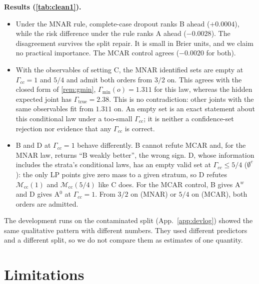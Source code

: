 \documentclass{article}
\theoremstyle{plain}
\theoremstyle{definition}
\theoremstyle{remark}
\newcommand{\Mcc}{\mathcal{M}_{\mathrm{cc}}}
\begin{document}
\textbf{Results (\cref{tab:clean1}).}
\begin{itemize}
\item Under the MNAR rule, complete-case dropout ranks B ahead ($+0.0004$),
while the risk difference under the rule ranks A ahead ($-0.0028$). The
disagreement survives the split repair. It is small in Brier units, and we
claim no practical importance. The MCAR control agrees ($-0.0020$ for both).
\item With the observables of setting C, the MNAR identified sets are empty
at $\Gamma_{cc}=1$ and $5/4$ and admit both orders from $3/2$ on. This agrees
with the closed form of \cref{rem:gmin}, $\Gamma_{\min}(o)=1.311$ for this
law, whereas the hidden expected joint has $\Gamma_{\mathrm{true}}=2.38$. This
is no contradiction: other joints with the same observables fit from $1.311$
on. An empty set is an exact statement about this conditional law under
a too-small $\Gamma_{cc}$; it is neither a confidence-set rejection nor
evidence that any $\Gamma_{cc}$ is correct.
\item B and D at $\Gamma_{cc}=1$ behave differently. B cannot refute MCAR and,
for the MNAR law, returns ``B weakly better'', the wrong sign. D, whose
information includes the strata's conditional laws, has an empty valid set
at $\Gamma_{cc}\le5/4$ ($\emptyset^{c}$): the only LP points give zero mass to a
given stratum, so D refutes $\Mcc(1)$ and $\Mcc(5/4)$ like C does. For the
MCAR control, B gives A$^{w}$ and D gives A$^{0}$ at $\Gamma_{cc}=1$. From
$3/2$ on (MNAR) or $5/4$ on (MCAR), both orders are admitted.
\end{itemize}
The development runs on the contaminated split (App.~\ref{app:devlog})
showed the same qualitative pattern with different numbers. They used
different predictors and a different split, so we do not compare them as
estimates of one quantity.

\section{Limitations}
\label{sec:limits}
\end{document}
